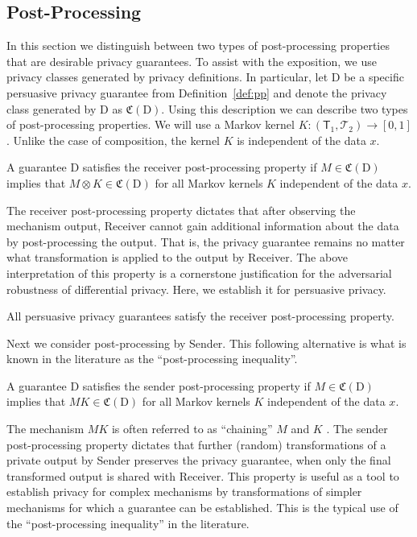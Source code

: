 \documentclass{article}
\theoremstyle{plain}
\theoremstyle{plain}
\theoremstyle{definition}
\theoremstyle{remark}
\theoremstyle{plain}
\begin{document}
\subsection{Post-Processing}\label{sec:postprocessing}
In this section we distinguish between two types of post-processing properties that are desirable privacy guarantees. To assist with the exposition, we use privacy classes generated by privacy definitions. In particular, let $\mathrm{D}$ be a specific persuasive privacy guarantee from Definition~\ref{def:pp} and denote the privacy class generated by $\mathrm{D}$ as $\mathfrak{C}(\mathrm{D})$. Using this description we can describe two types of post-processing properties. We will use a Markov kernel $K:(\mathsf{T}_1,\mathcal{T}_2) \rightarrow [0,1]$. Unlike the case of composition, the kernel $K$ is independent of the data $x$.
\begin{definition}\label{def:recpost}
    A guarantee $\mathrm{D}$ satisfies the receiver post-processing property if 
    $M \in \mathfrak{C}(\mathrm{D})$ implies that $M\otimes K \in \mathfrak{C}(\mathrm{D})$ for all Markov kernels $K$ independent of the data $x$.
\end{definition}
The receiver post-processing property dictates that after observing the mechanism output, Receiver cannot gain additional information about the data by post-processing the output. That is, the privacy guarantee remains no matter what transformation is applied to the output by Receiver. The above interpretation of this property is a cornerstone justification for the adversarial robustness of differential privacy. Here, we establish it for persuasive privacy.
\begin{proposition}\label{prop:recpost}
    All persuasive privacy guarantees satisfy the receiver post-processing property.
\end{proposition}
Next we consider post-processing by Sender. This following alternative is what is known in the literature as the ``post-processing inequality''. 
\begin{definition}\label{def:sendpost}
     A guarantee $\mathrm{D}$ satisfies the sender post-processing property if 
    $M \in \mathfrak{C}(\mathrm{D})$ implies that $MK \in \mathfrak{C}(\mathrm{D})$ for all Markov kernels $K$ independent of the data $x$.
\end{definition}
The mechanism $MK$ is often referred to as ``chaining'' $M$ and $K$ \citep{hayProgrammingFrameworkOpenDP2021}. The sender post-processing property dictates that further (random) transformations of a private output by Sender preserves the privacy guarantee, when only the final transformed output is shared with Receiver. This property is useful as a tool to establish privacy for complex mechanisms by transformations of simpler mechanisms for which a guarantee can be established. This is the typical use of the ``post-processing inequality'' in the literature. 
\end{document}
